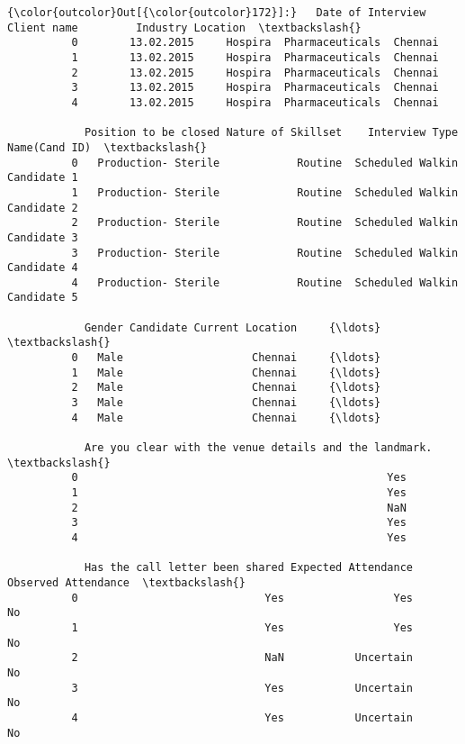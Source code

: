 \documentclass[11pt]{article}
\begin{document}
\begin{Verbatim}[commandchars=\\\{\}]
{\color{outcolor}Out[{\color{outcolor}172}]:}   Date of Interview Client name         Industry Location  \textbackslash{}
          0        13.02.2015     Hospira  Pharmaceuticals  Chennai   
          1        13.02.2015     Hospira  Pharmaceuticals  Chennai   
          2        13.02.2015     Hospira  Pharmaceuticals  Chennai   
          3        13.02.2015     Hospira  Pharmaceuticals  Chennai   
          4        13.02.2015     Hospira  Pharmaceuticals  Chennai   
          
            Position to be closed Nature of Skillset    Interview Type Name(Cand ID)  \textbackslash{}
          0   Production- Sterile            Routine  Scheduled Walkin   Candidate 1   
          1   Production- Sterile            Routine  Scheduled Walkin   Candidate 2   
          2   Production- Sterile            Routine  Scheduled Walkin   Candidate 3   
          3   Production- Sterile            Routine  Scheduled Walkin   Candidate 4   
          4   Production- Sterile            Routine  Scheduled Walkin   Candidate 5   
          
            Gender Candidate Current Location     {\ldots}      \textbackslash{}
          0   Male                    Chennai     {\ldots}       
          1   Male                    Chennai     {\ldots}       
          2   Male                    Chennai     {\ldots}       
          3   Male                    Chennai     {\ldots}       
          4   Male                    Chennai     {\ldots}       
          
            Are you clear with the venue details and the landmark.  \textbackslash{}
          0                                                Yes       
          1                                                Yes       
          2                                                NaN       
          3                                                Yes       
          4                                                Yes       
          
            Has the call letter been shared Expected Attendance Observed Attendance  \textbackslash{}
          0                             Yes                 Yes                  No   
          1                             Yes                 Yes                  No   
          2                             NaN           Uncertain                  No   
          3                             Yes           Uncertain                  No   
          4                             Yes           Uncertain                  No   
          

\end{Verbatim}
\end{document}
